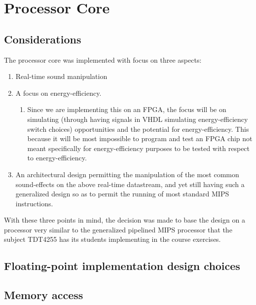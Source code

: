 \FloatBarrier
\section{Processor Core}\label{section:fpga-processor-core}

\FloatBarrier
\subsection{Considerations}

The processor core was implemented with focus on three aspects:

\begin{enumerate}
	\item Real-time sound manipulation
	\item A focus on energy-efficiency.
	\begin{enumerate}
		\item Since we are implementing this on an FPGA, the focus will be on
simulating (through having signals in VHDL simulating energy-efficiency switch
choices) opportunities and the potential for energy-efficiency. This because
it will be most impossible to program and test an FPGA chip not meant
specifically for energy-efficiency purposes to be tested with respect to
energy-efficiency.
	\end{enumerate}
	\item An architectural design permitting the manipulation of the most common
sound-effects on the above real-time datastream, and yet still having such a
generalized design so as to permit the running of most standard MIPS
instructions.
\end{enumerate}

With these three points in mind, the decision was made to base the design on a
processor very similar to the generalized pipelined MIPS processor that the
subject TDT4255\cite{tdt4255} has its students implementing in the course
exercises.

\FloatBarrier


\FloatBarrier
\subsection{Floating-point implementation design choices}

\FloatBarrier
\subsection{Memory access}
